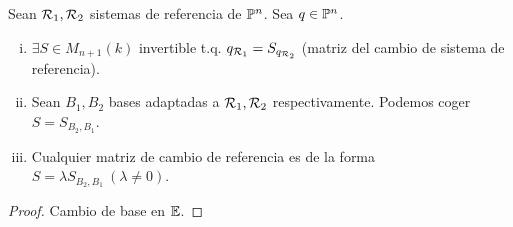 \begin{prop}
    Sean $\mathcal{R}_1, \mathcal{R}_2$ sistemas de referencia de $\mathbb{P}^n$. Sea $q \in \mathbb{P}^n$.
    \begin{enumerate}[i)]
        \item $\exists S \in M_{n+1}(k)$ invertible t.q. $q_{\mathcal{R}_1} = S_{q_{\mathcal{R}_2}}$
        (matriz del cambio de sistema de referencia).
        \item Sean $B_1, B_2$ bases adaptadas a $\mathcal{R}_1, \mathcal{R}_2$ respectivamente. Podemos coger $S=S_{B_2, B_1}$.
        \item Cualquier matriz de cambio de referencia es de la forma $S=\lambda S_{B_2, B_1} \ (\lambda \neq 0)$.
    \end{enumerate}
\end{prop}
\begin{proof}
    Cambio de base en $\mathbb{E}$.
\end{proof}
